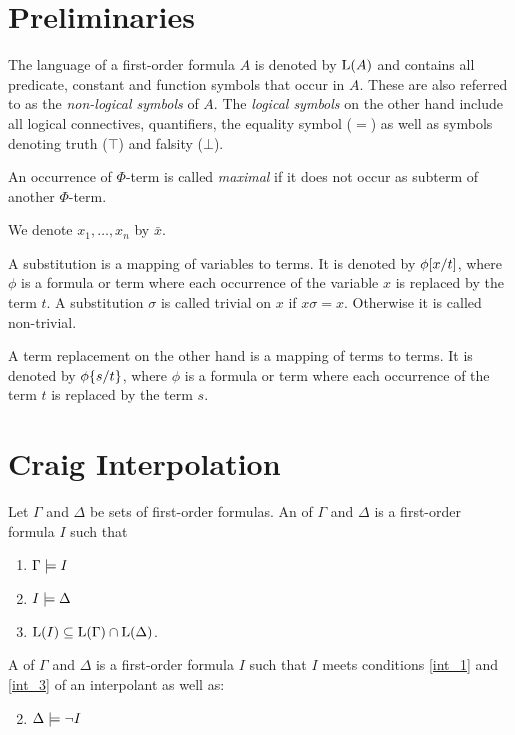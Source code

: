 \section{Preliminaries}

The language of a first-order formula $A$ is denoted by $\operatorname{L}(A)$ and contains all predicate, constant and function symbols that occur in $A$.
These are also referred to as the \emph{non-logical symbols} of $A$.
The \emph{logical symbols} on the other hand include all logical connectives, quantifiers, the equality symbol ($=$) as well as symbols denoting truth ($\top$) and falsity ($\bot$).

An occurrence of $\Phi$-term is called \emph{maximal} if it does not occur as subterm of another $\Phi$-term.

We denote $x_1, \ldots, x_n$ by $\bar x$.

A substitution is a mapping of variables to terms. It is denoted by $\phi[x/t]$, where $\phi$ is a formula or term where each occurrence of the variable $x$ is replaced by the term $t$.
A substitution $\sigma$ is called trivial on $x$ if $x\sigma = x$. Otherwise it is called non-trivial.

A term replacement on the other hand is a mapping of terms to terms. It is denoted by $\phi\{s/t\}$, where $\phi$ is a formula or term where each occurrence of the term $t$ is replaced by the term $s$.

\section{Craig Interpolation}


\begin{defi}
	\label{def:interpolant}
	Let $\Gamma$ and $\Delta$ be sets of first-order formulas.
	An  of $\Gamma$ and $\Delta$ is a first-order formula $I$ such that 
	\begin{enumerate}
		\item $ \Gamma \models I$ \label{int_1}
		\item $ I \models \Delta $  \label{int_2}
		\item $ \operatorname{L}(I) \subseteq \operatorname{L}(\Gamma) \cap \operatorname{L}(\Delta)$.  \label{int_3}
	\end{enumerate}

	\begin{samepage}
		A  of $\Gamma$ and $\Delta$ is a first-order formula $I$ such that $I$ meets conditions \ref{int_1} and \ref{int_3} of an interpolant as well as:
		\begin{enumerate}[\quad\:1'.]
				\setcounter{enumi}{1}
			\item $ \Delta \models \lnot I $  \label{int_2prime}
				\qedhere
		\end{enumerate}
	\end{samepage}
\end{defi}


